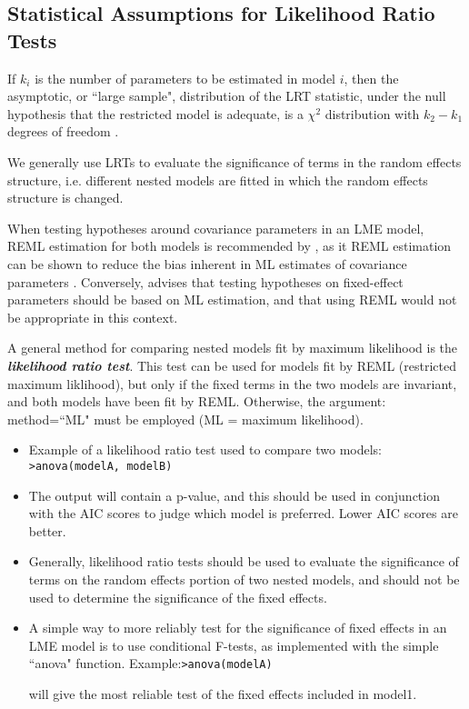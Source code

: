 \documentclass[12pt, a4paper]{report}
\theoremstyle{plain}
\theoremstyle{definition}
\theoremstyle{remark}
\begin{document}
	\subsection{Statistical Assumptions for Likelihood Ratio Tests}
	
	
	If $k_i$ is the number of parameters to be estimated in model $i$, then the asymptotic, or ``large sample", distribution of the LRT statistic, under the null hypothesis that the restricted model is adequate, is a $\chi^2$ distribution with $k_2-k_1$ degrees of freedom \citep[pg.83]{pb}.
	
	
	We generally use LRTs to evaluate the significance of terms in the random effects structure, i.e. different nested models are fitted in which the random effects structure is changed.
	
	
	When testing hypotheses around covariance parameters in an LME model, REML estimation for both models is recommended by \citep{west}, as it REML estimation can be shown to reduce the bias inherent in ML estimates of covariance parameters . Conversely, \citet{pb} advises that testing hypotheses on fixed-effect parameters should be based on ML estimation, and that using REML would not be appropriate in this context.
	
	
	
	
	
	
	
	A general method for comparing nested models fit by maximum likelihood is the \textbf{\emph{likelihood ratio test}}. This test can be used for models fit by REML (restricted maximum liklihood), but only if the fixed terms in the two models are invariant, and both models have been fit by REML. Otherwise, the argument: method=``ML" must be employed (ML = maximum likelihood).
	
	\begin{itemize}
		\item Example of a likelihood ratio test used to compare two models: \newline \texttt{>anova(modelA, modelB)}
		
		\item The output will contain a p-value, and this should be used in conjunction with the AIC scores to judge which model is preferred. Lower AIC scores are better.
		
		\item Generally, likelihood ratio tests should be used to evaluate the significance of terms on the
		random effects portion of two nested models, and should not be used to determine the significance of the fixed effects.
		\item A simple way to more reliably test for the significance of fixed effects in an LME model is to use
		conditional F-tests, as implemented with the simple ``anova" function.
		Example:\newline \texttt{>anova(modelA)}
		
		
		will give the most reliable test of the fixed effects included in model1.
	\end{itemize}
	
\end{document}
